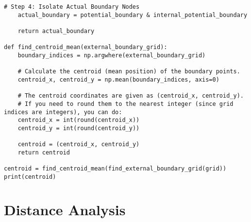 \begin{lstlisting}[caption=Center of Mass Algorithm, label=lst:center-of-mass]
    # Step 4: Isolate Actual Boundary Nodes
    actual_boundary = potential_boundary & internal_potential_boundary

    return actual_boundary

def find_centroid_mean(external_boundary_grid):
    boundary_indices = np.argwhere(external_boundary_grid)
    
    # Calculate the centroid (mean position) of the boundary points.
    centroid_x, centroid_y = np.mean(boundary_indices, axis=0)
    
    # The centroid coordinates are given as (centroid_x, centroid_y).
    # If you need to round them to the nearest integer (since grid indices are integers), you can do:
    centroid_x = int(round(centroid_x))
    centroid_y = int(round(centroid_y))
    
    centroid = (centroid_x, centroid_y)
    return centroid
    
centroid = find_centroid_mean(find_external_boundary_grid(grid))
print(centroid)
\end{lstlisting}

\section{Distance Analysis}

